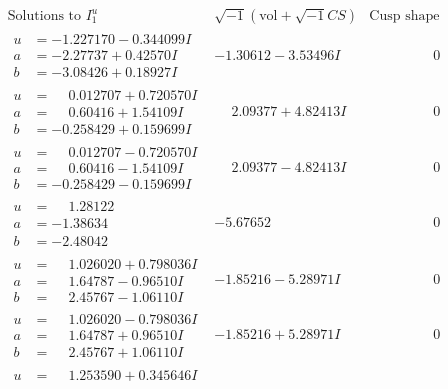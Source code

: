 \documentclass[1p]{elsarticle_modified}
\theoremstyle{definition}
\newcommand{\I}{\sqrt{-1}}
\begin{document}
$$\begin{array}{c|c|c}
\text{Solutions to }I^u_{1}& \I (\text{vol} + \sqrt{-1}CS) & \text{Cusp shape}\\
 \hline 
\begin{aligned}
u &= -1.227170 - 0.344099 I \\
a &= -2.27737 + 0.42570 I \\
b &= -3.08426 + 0.18927 I\end{aligned}
 & -1.30612 - 3.53496 I & \phantom{-0.000000 } 0 \\ \hline\begin{aligned}
u &= \phantom{-}0.012707 + 0.720570 I \\
a &= \phantom{-}0.60416 + 1.54109 I \\
b &= -0.258429 + 0.159699 I\end{aligned}
 & \phantom{-}2.09377 + 4.82413 I & \phantom{-0.000000 } 0 \\ \hline\begin{aligned}
u &= \phantom{-}0.012707 - 0.720570 I \\
a &= \phantom{-}0.60416 - 1.54109 I \\
b &= -0.258429 - 0.159699 I\end{aligned}
 & \phantom{-}2.09377 - 4.82413 I & \phantom{-0.000000 } 0 \\ \hline\begin{aligned}
u &= \phantom{-}1.28122\phantom{ +0.000000I} \\
a &= -1.38634\phantom{ +0.000000I} \\
b &= -2.48042\phantom{ +0.000000I}\end{aligned}
 & -5.67652\phantom{ +0.000000I} & \phantom{-0.000000 } 0 \\ \hline\begin{aligned}
u &= \phantom{-}1.026020 + 0.798036 I \\
a &= \phantom{-}1.64787 - 0.96510 I \\
b &= \phantom{-}2.45767 - 1.06110 I\end{aligned}
 & -1.85216 - 5.28971 I & \phantom{-0.000000 } 0 \\ \hline\begin{aligned}
u &= \phantom{-}1.026020 - 0.798036 I \\
a &= \phantom{-}1.64787 + 0.96510 I \\
b &= \phantom{-}2.45767 + 1.06110 I\end{aligned}
 & -1.85216 + 5.28971 I & \phantom{-0.000000 } 0 \\ \hline\begin{aligned}
u &= \phantom{-}1.253590 + 0.345646 I \\

\end{aligned}
\end{array}$$
\end{document}
